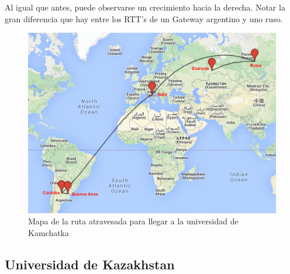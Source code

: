 Al igual que antes, puede observarse un crecimiento hacia la derecha. Notar la gran diferencia que hay entre los RTT's de un Gateway argentino y uno ruso.

\begin{figure}[H]
	\begin{center}
		  \includegraphics[scale=0.4]{../mapas/mapa_kamgu.png}
		  \caption{Mapa de la ruta atravesada para llegar a la universidad de Kamchatka}
		  \label{fig:contra1}
	\end{center}
\end{figure}

\subsection{Universidad de Kazakhstan}

